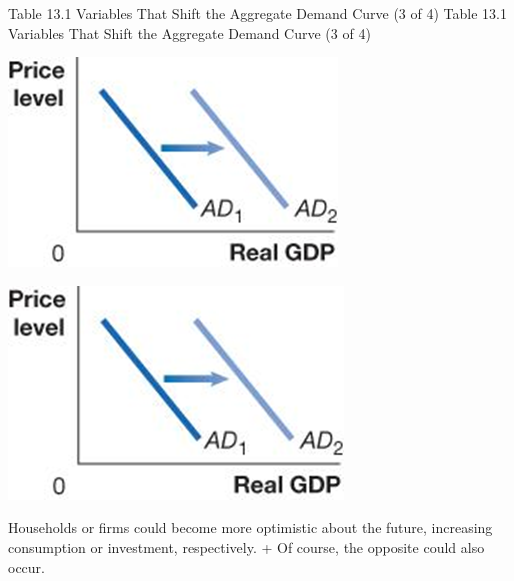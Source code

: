 \documentclass[
  12pt,
  ignorenonframetext,
]{beamer}
\begin{document}
\begin{frame}{Table 13.1 Variables That Shift the Aggregate Demand Curve
(3 of 4)}
\protect\hypertarget{table-13.1-variables-that-shift-the-aggregate-demand-curve-3-of-4}{}
Table 13.1 Variables That Shift the Aggregate Demand Curve (3 of 4)

\includegraphics[width=\textwidth,height=0.99\textheight]{imgs3/img_slide15a.png}

\includegraphics[width=\textwidth,height=0.99\textheight]{imgs3/img_slide15b.png}

Households or firms could become more optimistic about the future,
increasing consumption or investment, respectively. + Of course, the
opposite could also occur.
\end{frame}
\end{document}

